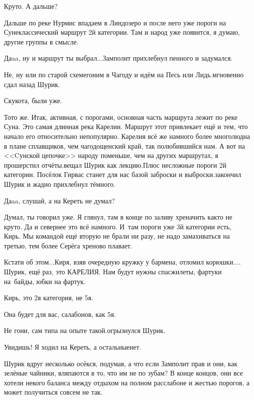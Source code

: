 \diagdash Круто. А дальше? 

\diagdash Дальше по реке Нурмис впадаем в Линдозеро и после него уже пороги на Суне\mdash классический маршрут 2\sdash й категории. Там и народ уже появится, я думаю, другие группы в смысле.

\diagdash Да\sdash a\sdash a, ну и маршрут ты выбрал$\ldots$\mdash Замполит прихлебнул пенного и задумался.

\diagdash Не, ну или по старой схеме\mdash гоним в Чагоду и идём на Песь или Лидь.\mdash мгновенно сдал назад Шурик.

\diagdash Скукота, были уже.

\diagdash То\sdash то же. Итак, активная, с порогами, основная часть маршрута лежит по реке Суна. Это самая длинная река Карелии. Маршрут этот привлекает ещё и тем, что начало его относительно непопулярно. Карелия всё же намного более многолюдна в плане сплавщиков, чем чагодощенский край, так полюбившийся нам. А вот на <<Cунской цепочке>> народу поменьше, чем на других маршрутах, я прошерстил отчёты.\mdash вещал Шурик как лекцию.\mdash Плюс несложные пороги 2\sdash й категории. Посёлок Гирвас станет для нас базой заброски и выброски.\mdash закончил Шурик и жадно прихлебнул тёмного.

\diagdash Да\sdash a\sdash a, слушай, а на Кереть не думал?

\diagdash Думал, ты говорил уже. Я глянул, там в конце по заливу хреначить как\sdash то не круто. Да и севернее это всё намного. И~там пороги уже 3\sdash й категории есть, Кирь. Мы командой ещё вторую не брали ни разу, не надо замахиваться на третью, тем более Серёга хреново плавает. 

\diagdash Кстати об этом$\ldots$\mdash Киря, взяв очередную кружку у бармена, отломил корюшки.\mdash $\ldots$Шурик, ещё раз, это КАРЕЛИЯ. Нам будут нужны спасжилеты, фартуки на~байды, юбки на фартук.

\diagdash Кирь, это 2\sdash я категория, не 5\sdash я.

\diagdash Она будет для вас, салабонов, как 5\sdash я.

\diagdash Не гони, сам типа на опыте такой.\mdash огрызнулся Шурик.

\diagdash Увидишь! Я ходил на Кереть, а остальные\mdash нет.

Шурик вдруг несколько осёкся, подумав, а что если Замполит прав и они, как зелёные чайники, вляпаются в то, что им не по зубам? В конце концов, они все хотели некого баланса между отдыхом на полном расслабоне и жестью порогов, а может получиться совсем не так.

